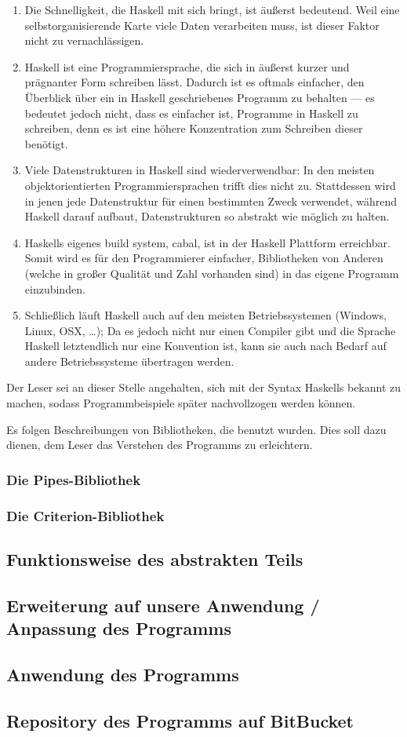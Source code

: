 \documentclass[twoside,a4paper,draft]{article}
\begin{document}
\begin{enumerate}
\item Die Schnelligkeit, die Haskell mit sich bringt, ist äußerst bedeutend. Weil eine selbstorganisierende Karte viele Daten verarbeiten muss, ist dieser Faktor nicht zu vernachlässigen.
\item Haskell ist eine Programmiersprache, die sich in äußerst kurzer und prägnanter Form schreiben lässt. Dadurch ist es oftmals einfacher, den Überblick über ein in Haskell geschriebenes Programm zu behalten --- es bedeutet jedoch nicht, dass es einfacher ist, Programme in Haskell zu schreiben, denn es ist eine höhere Konzentration zum Schreiben dieser benötigt.
\item Viele Datenstrukturen in Haskell sind wiederverwendbar: In den meisten objektorientierten Programmiersprachen trifft dies nicht zu. Stattdessen wird in jenen jede Datenstruktur für einen bestimmten Zweck verwendet, während Haskell darauf aufbaut, Datenstrukturen so abstrakt wie möglich zu halten.
\item Haskells eigenes \glqq{}build system\grqq{}, cabal, ist in der Haskell Plattform erreichbar. Somit wird es für den Programmierer einfacher, Bibliotheken von Anderen (welche in großer Qualität und Zahl vorhanden sind) in das eigene Programm einzubinden.
\item Schließlich läuft Haskell auch auf den meisten Betriebssystemen (Windows, Linux, OSX, \dots{}); Da es jedoch nicht nur einen Compiler gibt und die Sprache Haskell letztendlich nur eine Konvention ist, kann sie auch nach Bedarf auf andere Betriebssysteme übertragen werden.
\end{enumerate}

Der Leser sei an dieser Stelle angehalten, sich mit der Syntax Haskells bekannt zu machen, sodass Programmbeispiele später nachvollzogen werden können.

Es folgen Beschreibungen von Bibliotheken, die benutzt wurden. Dies soll dazu dienen, dem Leser das Verstehen des Programms zu erleichtern.

\subsubsection{Die Pipes-Bibliothek}

\subsubsection{Die Criterion-Bibliothek}

\subsection{Funktionsweise des abstrakten Teils}

\subsection{Erweiterung auf unsere Anwendung / Anpassung des Programms}

\subsection{Anwendung des Programms}

\subsection{Repository des Programms auf BitBucket}
\end{document}

